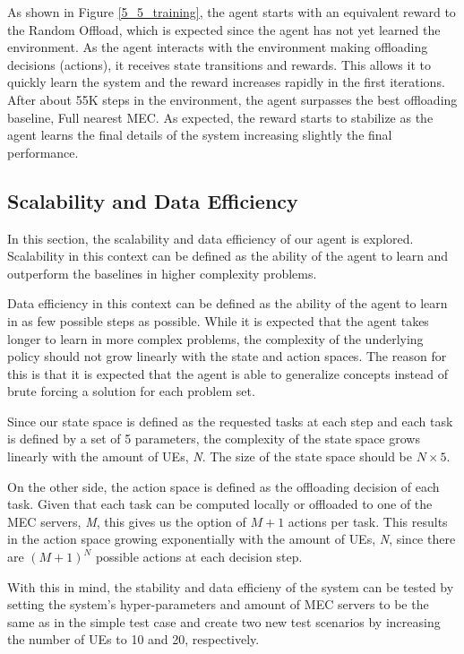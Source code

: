 \documentclass[conference]{IEEEtran}
\begin{document}
As shown in Figure \ref{5_5_training}, the agent starts with an equivalent reward to the Random Offload, which is expected since the agent has not yet learned the environment. As the agent interacts with the environment making offloading decisions (actions), it receives state transitions and rewards. This allows it to quickly learn the system and the reward increases rapidly in the first iterations. After about 55K steps in the environment, the agent surpasses the best offloading baseline, Full nearest MEC. As expected, the reward starts to stabilize as the agent learns the final details of the system increasing slightly the final performance.

\subsection{Scalability and Data Efficiency} \label{scalability_data}

In this section, the scalability and data efficiency of our agent is explored. Scalability in this context can be defined as the ability of the agent to learn and outperform the baselines in higher complexity problems. 

Data efficiency in this context can be defined as the ability of the agent to learn in as few possible steps as possible. While it is expected that the agent takes longer to learn in more complex problems, the complexity of the underlying policy should not grow linearly with the state and action spaces. The reason for this is that it is expected that the agent is able to generalize concepts instead of brute forcing a solution for each problem set.

Since our state space is defined as the requested tasks at each step and each task is defined by a set of 5 parameters, the complexity of the state space grows linearly with the amount of \acrshort{UE}s, \emph{N}. The size of the state space should be $N \times 5$. 

On the other side, the action space is defined as the offloading decision of each task. Given that each task can be computed locally or offloaded to one of the \acrshort{MEC} servers, \emph{M}, this gives us the option of $M + 1$ actions per task. This results in the action space growing exponentially with the amount of \acrshort{UE}s, \emph{N}, since there are $(M + 1)^N$ possible actions at each decision step.

With this in mind, the stability and data efficieny of the system can be tested by setting the system's hyper-parameters and amount of \acrshort{MEC} servers to be the same as in the simple test case and create two new test scenarios by increasing the number of \acrshort{UE}s to 10 and 20, respectively.
\end{document}
